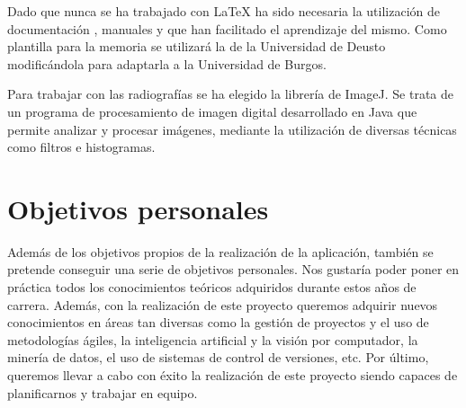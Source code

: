 Dado que nunca se ha trabajado con \LaTeX{} ha sido necesaria la utilización de documentación , manuales  y  que han facilitado el aprendizaje del mismo. Como plantilla para la memoria se utilizará la de la Universidad de Deusto  modificándola para adaptarla a la Universidad de Burgos.

Para trabajar con las radiografías se ha elegido la librería de ImageJ. Se trata de un programa de procesamiento de imagen digital desarrollado en Java que permite analizar y procesar imágenes, mediante la utilización de diversas técnicas como filtros e histogramas.

\section{Objetivos personales}
Además de los objetivos propios de la realización de la aplicación, también se pretende conseguir una serie de objetivos personales.
Nos gustaría poder poner en práctica todos los conocimientos teóricos adquiridos durante estos años de carrera. Además, con la realización de este proyecto queremos adquirir nuevos conocimientos en áreas tan diversas como la gestión de proyectos y el uso de metodologías ágiles, la inteligencia artificial y la visión por computador, la minería de datos, el uso de sistemas de control de versiones, etc.
Por último, queremos llevar a cabo con éxito la realización de este proyecto siendo capaces de planificarnos y trabajar en equipo.

